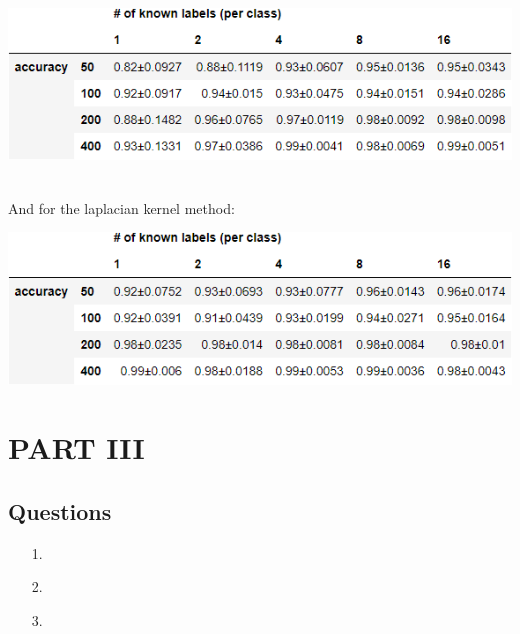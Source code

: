 \documentclass[12pt]{article}
\begin{document}
\includegraphics{outputs/part2/laplacian_interpolation_report.png}

\\

And for the laplacian kernel method:

\includegraphics{outputs/part2/laplacian_kernel_interpolation_report.png}



\newpage



\section{PART III}
\subsection{Questions}
\begin{itemize}
    \item[1.]
    \item[2.]
    \item[3.]
\end{itemize}
\end{document}
